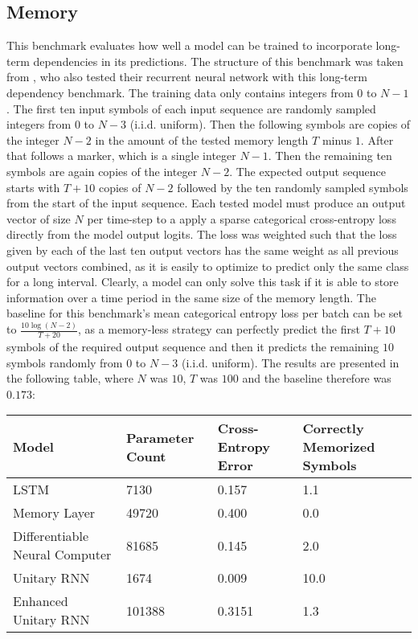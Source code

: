 \documentclass[draft,final]{vutinfth} %
\begin{document}
    \subsection{Memory}
    This benchmark evaluates how well a model can be trained to incorporate long-term dependencies in its predictions.
    The structure of this benchmark was taken from \cite{UnitaryRNNs}, who also tested their recurrent neural network with this long-term dependency benchmark.
    The training data only contains integers from $0$ to $N-1$. The first ten input symbols of each input sequence are randomly sampled integers from $0$ to $N-3$ (i.i.d. uniform).
    Then the following symbols are copies of the integer $N-2$ in the amount of the tested memory length $T$ minus $1$.
    After that follows a marker, which is a single integer $N-1$.
    Then the remaining ten symbols are again copies of the integer $N-2$.
    The expected output sequence starts with $T+10$ copies of $N-2$ followed by the ten randomly sampled symbols from the start of the input sequence.
    Each tested model must produce an output vector of size $N$ per time-step to a apply a sparse categorical cross-entropy loss directly from the model output logits.
    The loss was weighted such that the loss given by each of the last ten output vectors has the same weight as all previous output vectors combined, as it is easily to optimize to predict only the same class for a long interval.
    Clearly, a model can only solve this task if it is able to store information over a time period in the same size of the memory length.
    The baseline for this benchmark's mean categorical entropy loss per batch can be set to $\frac{10\log(N-2)}{T+20}$, as a memory-less strategy can perfectly predict the first $T+10$ symbols of the required output sequence and then it predicts the remaining $10$ symbols randomly from $0$ to $N-3$ (i.i.d. uniform).
    The results are presented in the following table, where $N$ was $10$, $T$ was $100$ and the baseline therefore was $0.173$:
    \begin{table}[h]
        \begin{tabular}{llll}
            \hline
            Model                          & Parameter Count & Cross-Entropy Error & Correctly Memorized Symbols \\ \hline
            LSTM                           & 7130            & 0.157               & 1.1                         \\
            Memory Layer                   & 49720           & 0.400               & 0.0                         \\
            Differentiable Neural Computer & 81685           & 0.145               & 2.0                         \\
            Unitary RNN                    & 1674            & 0.009               & 10.0                        \\
            Enhanced Unitary RNN           & 101388          & 0.3151              & 1.3                         \\
        \end{tabular}
    \end{table}
\end{document}
